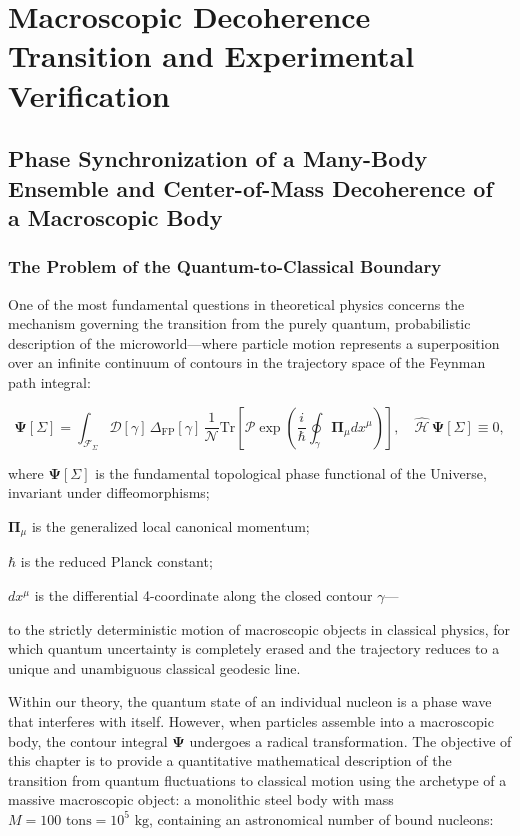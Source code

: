 \section{Macroscopic Decoherence Transition and Experimental Verification}\label{sec:rozdil5}

\subsection{Phase Synchronization of a Many-Body Ensemble and Center-of-Mass Decoherence of a Macroscopic Body}\label{sec:5.1}

\subsubsection{The Problem of the Quantum-to-Classical Boundary}\label{sec:5.1.1}

One of the most fundamental questions in theoretical physics concerns the mechanism governing the transition from the purely quantum, probabilistic description of the microworld---where particle motion represents a superposition over an infinite continuum of contours in the trajectory space of the Feynman path integral:

\begin{equation}\label{eq:5.1}\tag{5.1}
\mathbf{\Psi}[\Sigma] = \int_{\mathcal{F}_\Sigma} \mathcal{D}[\gamma] \, \Delta_{\text{FP}}[\gamma] \, \frac{1}{\mathcal{N}} \text{Tr}\left[ \mathcal{P}\exp\left( \frac{i}{\hbar} \oint_\gamma \mathbf{\Pi}_\mu dx^\mu \right) \right], \quad \hat{\mathcal{H}}\,\mathbf{\Psi}[\Sigma] \equiv 0,
\end{equation}

where $\mathbf{\Psi}[\Sigma]$ is the fundamental topological phase functional of the Universe, invariant under diffeomorphisms;  

$\mathbf{\Pi}_\mu$ is the generalized local canonical momentum;  

$\hbar$ is the reduced Planck constant;  

$dx^\mu$ is the differential 4-coordinate along the closed contour $\gamma$---

to the strictly deterministic motion of macroscopic objects in classical physics, for which quantum uncertainty is completely erased and the trajectory reduces to a unique and unambiguous classical geodesic line.

Within our theory, the quantum state of an individual nucleon is a phase wave that interferes with itself. However, when particles assemble into a macroscopic body, the contour integral $\mathbf{\Psi}$ undergoes a radical transformation. The objective of this chapter is to provide a quantitative mathematical description of the transition from quantum fluctuations to classical motion using the archetype of a massive macroscopic object: a monolithic steel body with mass $M = 100\text{ tons} = 10^5\text{ kg}$, containing an astronomical number of bound nucleons:

